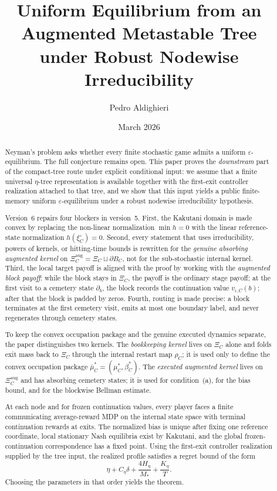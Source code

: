 \documentclass[12pt]{article}
\title{\textbf{Uniform Equilibrium from an Augmented Metastable Tree\\under Robust Nodewise Irreducibility}}
\author{Pedro Aldighieri}
\date{March 2026}
\theoremstyle{definition}
\newcommand{\eps}{\varepsilon}
\newcommand{\1}{\mathbf{1}}
\begin{document}
\maketitle


\begin{abstract}
Neyman's problem asks whether every finite stochastic game admits a uniform
$\eps$-equilibrium. The full conjecture remains open. This paper proves the
\emph{downstream} part of the compact-tree route under explicit conditional input:
we assume that a finite universal $\eta$-tree representation is available together
with the first-exit controller realization attached to that tree, and we show that
this input yields a public finite-memory uniform $\eps$-equilibrium under a robust
nodewise irreducibility hypothesis.

Version~6 repairs four blockers in version~5. First, the Kakutani domain is made
convex by replacing the non-linear normalization $\min h=0$ with the linear
reference-state normalization $h(\xi_C^\circ)=0$. Second, every statement that
uses irreducibility, powers of kernels, or hitting-time bounds is rewritten for the
\emph{genuine absorbing augmented kernel} on
$\Xi_C^{\mathrm{aug}}=\Xi_C\sqcup\partial B_C$, not for the sub-stochastic
internal kernel. Third, the local target payoff is aligned with the proof by
working with the \emph{augmented block payoff}: while the block stays in $\Xi_C$,
the payoff is the ordinary stage payoff; at the first visit to a cemetery state
$\partial_b$, the block records the continuation value $v_{i,C}(b)$; after that
the block is padded by zeros. Fourth, routing is made precise: a block terminates
at the first cemetery visit, emits at most one boundary label, and never
regenerates through cemetery states.

To keep the convex occupation package and the genuine executed dynamics separate,
the paper distinguishes two kernels. The \emph{bookkeeping kernel} lives on
$\Xi_C$ alone and folds exit mass back to $\Xi_C$ through the internal restart map
$\rho_C$; it is used only to define the convex occupation package
$\bar\mu_C^*=(\mu_C^*,\beta_C^*)$. The \emph{executed augmented kernel} lives on
$\Xi_C^{\mathrm{aug}}$ and has absorbing cemetery states; it is used for
condition~\textnormal{(a)}, for the bias bound, and for the blockwise Bellman
estimate.

At each node and for frozen continuation values, every player faces a finite
communicating average-reward MDP on the internal state space with terminal
continuation rewards at exits. The normalized bias is unique after fixing one
reference coordinate, local stationary Nash equilibria exist by Kakutani, and the
global frozen-continuation correspondence has a fixed point. Using the first-exit
controller realization supplied by the tree input, the realized profile satisfies a
regret bound of the form
\[
\eta + C_\eta\delta + \frac{4H_\eta}{M_*} + \frac{K_\eta}{T}.
\]
Choosing the parameters in that order yields the theorem.
\end{abstract}
\end{document}
